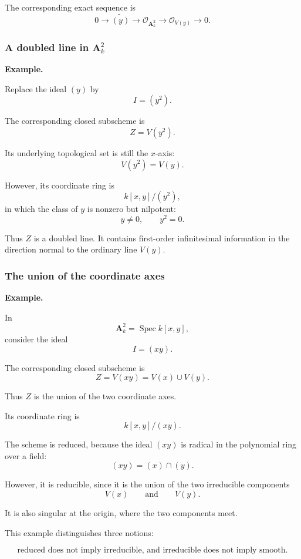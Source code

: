 \documentclass[12pt,a4paper]{article}
\theoremstyle{notespace}
\begin{document}
The corresponding exact sequence is
\[
0
\longrightarrow
\widetilde{(y)}
\longrightarrow
\mathcal O_{\mathbf A^2_k}
\longrightarrow
\mathcal O_{V(y)}
\longrightarrow
0.
\]

\subsubsection{A doubled line in \(\mathbf A^2_k\)}

\textbf{Example.}

Replace the ideal \((y)\) by
\[
I=(y^2).
\]

The corresponding closed subscheme is
\[
Z=V(y^2).
\]

Its underlying topological set is still the \(x\)-axis:
\[
V(y^2)=V(y).
\]

However, its coordinate ring is
\[
k[x,y]/(y^2),
\]
in which the class of \(y\) is nonzero but nilpotent:
\[
y\neq0,
\qquad
y^2=0.
\]

Thus \(Z\) is a doubled line. It contains first-order infinitesimal information in the direction normal to the ordinary line \(V(y)\).

\subsubsection{The union of the coordinate axes}

\textbf{Example.}

In
\[
\mathbf A^2_k=\operatorname{Spec}k[x,y],
\]
consider the ideal
\[
I=(xy).
\]

The corresponding closed subscheme is
\[
Z=V(xy)=V(x)\cup V(y).
\]

Thus \(Z\) is the union of the two coordinate axes.

Its coordinate ring is
\[
k[x,y]/(xy).
\]

The scheme is reduced, because the ideal \((xy)\) is radical in the polynomial ring over a field:
\[
(xy)=(x)\cap(y).
\]

However, it is reducible, since it is the union of the two irreducible components
\[
V(x)
\qquad\text{and}\qquad
V(y).
\]

It is also singular at the origin, where the two components meet.

This example distinguishes three notions:

\[
\boxed{
	\text{reduced does not imply irreducible, and irreducible does not imply smooth.}
}
\]
\end{document}
